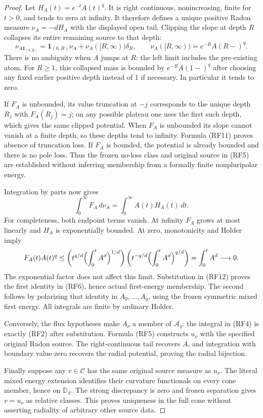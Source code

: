 \documentclass[11pt,a4paper]{article}
\numberwithin{equation}{section}
\theoremstyle{definition}
\theoremstyle{remark}
\begin{document}
\begin{proof}
Let $H_A(t)=e^{-t}A(t)^q$.  It is right continuous,
nonincreasing, finite for $t>0$, and tends to zero at
infinity.  It therefore defines a unique positive Radon
measure $\nu_A=-dH_A$ with the displayed open tail.
Clipping the slope at depth $R$ collapses its entire
remaining source to that depth:
\[
 \nu_{A\mathbf1_{(0,R)}}
       =\mathbf1_{(0,R)}\nu_A+\nu_A([R,\infty))\delta_R,
 \qquad
 \nu_A([R,\infty))=e^{-R}A(R-)^q.
 \tag{RF11}
\]
There is no ambiguity when $A$ jumps at $R$: the left
limit includes the pre-existing atom.  For $R\ge1$,
this collapsed mass is bounded by $e^{-R}A(1-)^q$
after choosing any fixed earlier positive depth instead
of $1$ if necessary.  In particular it tends to zero.

If $F_A$ is unbounded, its value truncation at $-j$
corresponds to the unique depth $R_j$ with $F_A(R_j)=j$;
on any possible plateau one uses the first such depth,
which gives the same clipped potential.  When $F_A$
is unbounded its slope cannot vanish at a finite depth,
so these depths tend to infinity.  Formula \textup{(RF11)}
proves absence of truncation loss.  If $F_A$ is bounded,
the potential is already bounded and there is no pole
loss.  Thus the frozen no-loss class and original source
in \textup{(RF5)} are established without inferring
membership from a formally finite nonpluripolar energy.

Integration by parts now gives
\[
              \int_0^\infty F_A\,d\nu_A
                   =\int_0^\infty A(t)H_A(t)\,dt.
 \tag{RF12}
\]
For completeness, both endpoint terms vanish.  At infinity
$F_A$ grows at most linearly and $H_A$ is exponentially
bounded.  At zero, monotonicity and Holder imply
\[
 F_A(t)A(t)^q
 \le \left(t^{q/d}\Bigl(\int_0^t A^d\Bigr)^{1/d}\right)
       \left(t^{-q/d}\Bigl(\int_0^t A^d\Bigr)^{q/d}\right)
 =\int_0^t A^d\longrightarrow0.
\]
The exponential factor does not affect this limit.
Substitution in \textup{(RF12)} proves the first identity
in \textup{(RF6)}, hence actual first-energy membership.
The second follows by polarizing that identity in
$A_0,\ldots,A_q$, using the frozen symmetric mixed first
energy.  All integrals are finite by ordinary Holder.

Conversely, the flux hypotheses make $A_\nu$ a member
of $\mathscr A_q$: the integral in \textup{(RF4)} is
exactly \textup{(RF2)} after substitution.  Formula
\textup{(RF5)} constructs $u_\nu$ with the specified
original Radon source.  The right-continuous tail recovers
$A$, and integration with boundary value zero recovers
the radial potential, proving the radial bijection.

Finally suppose any $v\in\mathscr C$ has the same
original source measure as $u_\nu$.  The literal mixed
energy extension identifies their curvature functionals
on every cone member, hence on $\mathbb D_S$.
The strong discrepancy is zero and frozen separation
gives $v=u_\nu$ as relative classes.  This proves
uniqueness in the full cone without asserting radiality
of arbitrary other source data.
\end{proof}
\end{document}
